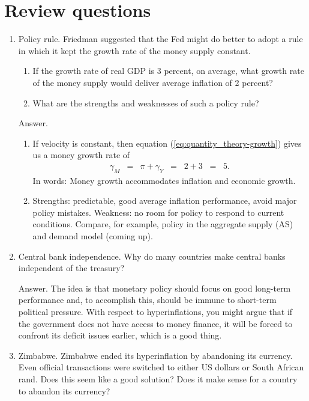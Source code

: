 \section*{Review questions}

\setlength{\leftmargini}{.5\oldleftmargini}
\begin{enumerate}
\item Policy rule.  Friedman suggested that the Fed might do better to adopt
a rule in which it kept the growth rate of the money supply constant.
\begin{enumerate}
\item If the growth rate of real GDP is 3 percent, on average,
what growth rate of the money supply would deliver
average inflation of 2 percent?
\item What are the strengths and weaknesses of such a policy rule?
\end{enumerate}

Answer.
\begin{enumerate}
\item If velocity is constant, then
equation (\ref{eq:quantity_theory-growth}) gives us
a money growth rate of
\begin{eqnarray*}
    \gamma_M &=& \pi + \gamma_Y
            \;\;=\;\;  2 + 3 \;\;=\;\; 5.
\end{eqnarray*}
In words: Money growth accommodates inflation and economic growth.
\item Strengths: predictable, good average inflation performance,
avoid major policy mistakes.
Weakness: no room for policy to respond to current conditions.
Compare, for example, policy in the aggregate supply (AS) 
 and demand model
(coming up).
\end{enumerate}


\item Central bank independence.
Why do many countries make central banks  independent of the treasury?

Answer.  The idea is that monetary policy should focus on good long-term
performance and, to accomplish this, should be immune to
short-term political pressure.
With respect to hyperinflations,
you might argue that if the government does not have access to money finance,
it will be forced to confront its deficit issues earlier,
which is a good thing.



\item Zimbabwe.
Zimbabwe ended its hyperinflation by abandoning its currency.
Even official transactions were switched to either US dollars or
    South African rand.
    Does this seem like a good solution?
    Does it make sense for a country to abandon its currency?


\end{enumerate}
